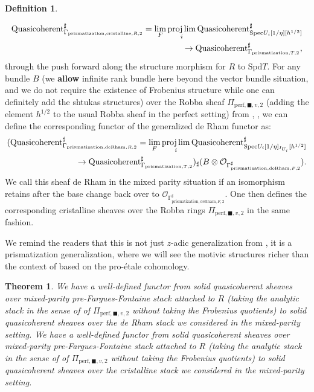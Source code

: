 \documentclass[12pt]{article}
\newtheorem{theorem}{Theorem}
\theoremstyle{definition}
\newtheorem{definition}{Definition}
\begin{document}
\begin{definition}
\begin{align}
\end{align}
\begin{align}
\mathrm{Quasicoherent}^\sharp_{\mathrm{\Gamma}_{\mathrm{prismatization},\mathrm{cristalline},R,2}}=\lim_{F}\projlim_i \mathrm{Quasicoherent}^\sharp_{\mathrm{Spec}U_i[1/\eta][h^{1/2}]}\\
\rightarrow \mathrm{Quasicoherent}^\sharp_{\mathrm{\Gamma}_{\mathrm{prismatization},T,2}},
\end{align}
through the push forward along the structure morphism for $R$ to $\mathrm{Spd}T$. For any bundle $B$ (we \textbf{allow} infinite rank bundle here beyond the vector bundle situation, and we do not require the existence of Frobenius structure while one can definitely add the shtukas structures) over the Robba sheaf $\Pi_{\mathrm{perf}, \blacksquare,v,2}$ (adding the element $h^{1/2}$ to the usual Robba sheaf in the perfect setting) from \cite{KLI}, \cite{KLII}, we can define the corresponding functor of the generalized de Rham functor as:
\begin{align}
(\mathrm{Quasicoherent}^\sharp_{\mathrm{\Gamma}_{\mathrm{prismatization},\mathrm{deRham},R,2}}=\lim_{F}\projlim_i \mathrm{Quasicoherent}^\sharp_{\mathrm{Spec}U_i[1/\eta]_{I_{U_i}}[h^{1/2}]}\\
\rightarrow \mathrm{Quasicoherent}^\sharp_{\mathrm{\Gamma}_{\mathrm{prismatization},T,2}})_\sharp(B\otimes \mathcal{O}_{\mathrm{\Gamma}^\sharp_{\mathrm{prismatization},\mathrm{deRham},F,2}}).
\end{align}
We call this sheaf de Rham in the mixed parity situation if an isomorphism retains after the base change back over to $\mathcal{O}_{\mathrm{\Gamma}^\sharp_{\mathrm{prismatization},\mathrm{deRham},F,2}}$. One then defines  the corresponding cristalline sheaves over the Robba rings $\Pi_{\mathrm{perf}, \blacksquare,v,2}$ in the same fashion.
\end{definition}

We remind the readers that this is not just $z$-adic generalization from \cite{TIV}, it is a prismatization generalization, where we will see the motivic structures richer than the context of \cite{TIV} based on the pro-\'etale cohomology.

\begin{theorem}
We have a well-defined functor from solid quasicoherent sheaves over mixed-parity pre-Fargues-Fontaine stack attached to $R$ (taking the analytic stack in the sense of \cite{CS3} of $\Pi_{\mathrm{perf},\blacksquare,v,2}$ without taking the Frobenius quotients) to solid quasicoherent sheaves over the de Rham stack we considered in the mixed-parity setting. We have a well-defined functor from solid quasicoherent sheaves over mixed-parity pre-Fargues-Fontaine stack attached to $R$ (taking the analytic stack in the sense of \cite{CS3} of $\Pi_{\mathrm{perf},\blacksquare,v,2}$ without taking the Frobenius quotients) to solid quasicoherent sheaves over the cristalline stack we considered in the mixed-parity setting. 
\end{theorem}
\end{document}
